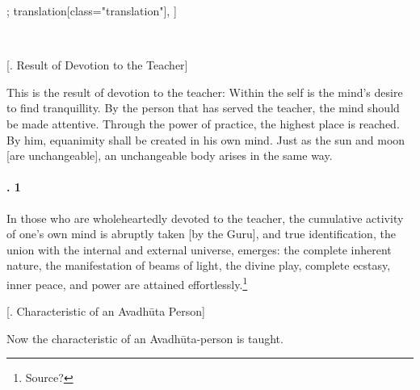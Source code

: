 \begin{alignment}[
  texts=edition[class="edition"];
  translation[class="translation"],
  ]
\begin{edition}
\begin{tlg}
\\
\end{tlg}
  \end{edition}
  \begin{translation}
    \begin{tlate}
\centerline{\textrm{\small{[. Result of Devotion to the Teacher]}}}
\bigskip
\noindent
  This is the result of devotion to the teacher: Within the self is the mind's desire to find tranquillity. By the person that has served the teacher, the mind should be made attentive. Through the power of practice, the highest place is reached. By him, equanimity shall be created in his own mind. Just as the sun and moon [are unchangeable], an unchangeable body arises in the same way.

 \paragraph{. 1} In those who are wholeheartedly devoted to the teacher, the cumulative activity of one's own mind is abruptly taken [by the Guru], and true identification, the union with the internal and external universe, emerges: the complete inherent nature, the manifestation of beams of light, the divine play, complete ecstasy, inner peace, and power are attained effortlessly.\footnote{Source?}
\end{tlate}
\begin{tlate}
  \bigskip
  \centerline{\textrm{\small{[. Characteristic of an Avadhūta Person]}}}
  \bigskip
  Now the characteristic of an Avadhūta-person is taught.
  

\end{tlate}
\end{translation}
\end{alignment}
